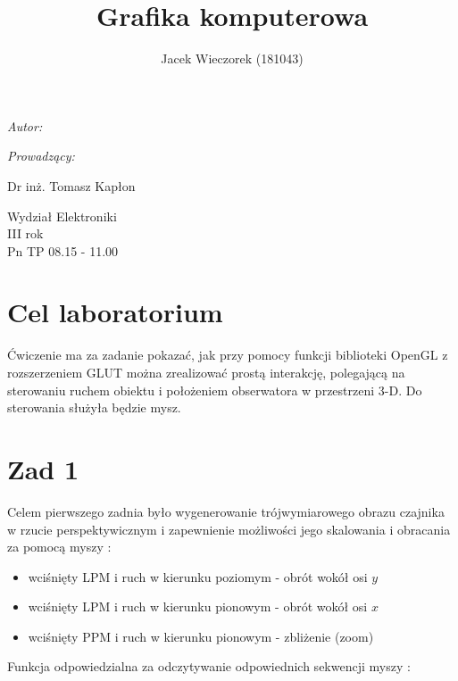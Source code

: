 \documentclass[wide,a4paper,titlepage,12pt] {article}
\title{Grafika komputerowa}
\author{Jacek Wieczorek (181043)}
\makeatletter
\renewcommand{\maketitle}{
\begin{titlepage}
  \begin{center}
    \vspace*{3cm}
    \LARGE \@title \par
    \vspace{2cm}
    \textit{\small Autor:}\par
    \normalsize \@author\par \normalsize
    \vspace{3cm}
    \textit{\small Prowadzący:}\par
    Dr inż. Tomasz Kapłon \par
    \vspace{2cm}
    Wydział Elektroniki\\ III rok\\ Pn TP 08.15 - 11.00\par
    \vspace{4cm}
    \small \@date
  \end{center}
\end{titlepage}
}
\makeatother
\begin{document}
\maketitle
  \section{Cel laboratorium}
  Ćwiczenie ma za zadanie pokazać, jak przy pomocy funkcji biblioteki OpenGL z rozszerzeniem GLUT można zrealizować prostą interakcję, polegającą na sterowaniu ruchem obiektu i położeniem obserwatora w przestrzeni 3-D. Do sterowania służyła będzie mysz. 
\section{Zad 1}
Celem pierwszego zadnia było wygenerowanie trójwymiarowego obrazu czajnika w rzucie perspektywicznym i zapewnienie możliwości jego skalowania i obracania za pomocą myszy : 
\begin{itemize}
	\item wciśnięty LPM i ruch w kierunku poziomym - obrót wokół osi $y$
	\item wciśnięty LPM i ruch w kierunku pionowym - obrót wokół osi $x$
	\item wciśnięty PPM i ruch w kierunku pionowym - zbliżenie (zoom)
\end{itemize} 
Funkcja odpowiedzialna za odczytywanie odpowiednich sekwencji myszy : 
\lstset{ %
    language=c++,                %
    basicstyle=\scriptsize,       %
    numbers=left,                   %
    numberstyle=\scriptsize,      %
    stepnumber=10,                   %
    numbersep=9pt,                  %
    showspaces=false,               %
    showstringspaces=false,         %
    showtabs=false,                 %
    breaklines=true,                %
    }
\end{document}
